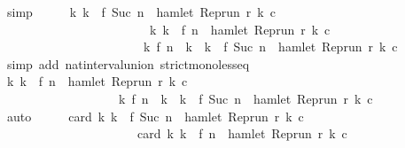 \begin{isabellebody}
\ simp\isanewline
\ \ \isamarkupfalse%
\ \isamarkupfalse%
\ {\isacartoucheopen}{\isacharbraceleft}k{\isachardot}\ k\ {\isasymle}\ f\ {\isacharparenleft}Suc\ n{\isacharparenright}\ {\isasymand}\ hamlet\ {\isacharparenleft}{\isacharparenleft}Rep{\isacharunderscore}run\ r{\isacharparenright}\ k\ c{\isacharparenright}{\isacharbraceright}\ {\isacharequal}\isanewline
\ \ \ \ \ \ \ \ \ \ \ \ \ \ \ \ \ \ \ \ \ \ \ \ {\isacharbraceleft}k{\isachardot}\ k\ {\isasymle}\ f\ n\ {\isasymand}\ hamlet\ {\isacharparenleft}{\isacharparenleft}Rep{\isacharunderscore}run\ r{\isacharparenright}\ k\ c{\isacharparenright}{\isacharbraceright}\isanewline
\ \ \ \ \ \ \ \ \ \ \ \ \ \ \ \ \ \ \ \ \ \ {\isasymunion}\ {\isacharbraceleft}k{\isachardot}\ f\ n\ {\isacharless}\ k\ {\isasymand}\ k\ {\isasymle}\ f\ {\isacharparenleft}Suc\ n{\isacharparenright}\ {\isasymand}\ hamlet\ {\isacharparenleft}{\isacharparenleft}Rep{\isacharunderscore}run\ r{\isacharparenright}\ k\ c{\isacharparenright}{\isacharbraceright}{\isacartoucheclose}\isanewline
\ \ \ \ \isamarkupfalse%
\ {\isacharparenleft}simp\ add{\isacharcolon}\ nat{\isacharunderscore}interval{\isacharunderscore}union\ strict{\isacharunderscore}mono{\isacharunderscore}less{\isacharunderscore}eq{\isacharparenright}\isanewline
\ \ \isamarkupfalse%
\ \isamarkupfalse%
\ {\isacartoucheopen}{\isacharbraceleft}k{\isachardot}\ k\ {\isasymle}\ f\ n\ {\isasymand}\ hamlet\ {\isacharparenleft}{\isacharparenleft}Rep{\isacharunderscore}run\ r{\isacharparenright}\ k\ c{\isacharparenright}{\isacharbraceright}\isanewline
\ \ \ \ \ \ \ \ \ \ \ \ \ \ \ \ \ \ {\isasyminter}\ {\isacharbraceleft}k{\isachardot}\ f\ n\ {\isacharless}\ k\ {\isasymand}\ k\ {\isasymle}\ f\ {\isacharparenleft}Suc\ n{\isacharparenright}\ {\isasymand}\ hamlet\ {\isacharparenleft}{\isacharparenleft}Rep{\isacharunderscore}run\ r{\isacharparenright}\ k\ c{\isacharparenright}{\isacharbraceright}\ {\isacharequal}\ {\isacharbraceleft}{\isacharbraceright}{\isacartoucheclose}\isanewline
\ \ \ \ \ \isamarkupfalse%
\ auto\isanewline
\ \ \isamarkupfalse%
\ \isamarkupfalse%
\ {\isacartoucheopen}card\ {\isacharbraceleft}k{\isachardot}\ k\ {\isasymle}\ f\ {\isacharparenleft}Suc\ n{\isacharparenright}\ {\isasymand}\ hamlet\ {\isacharparenleft}Rep{\isacharunderscore}run\ r\ k\ c{\isacharparenright}{\isacharbraceright}\ {\isacharequal}\isanewline
\ \ \ \ \ \ \ \ \ \ \ \ \ \ \ \ \ \ \ \ \ \ card\ {\isacharbraceleft}k{\isachardot}\ k\ {\isasymle}\ f\ n\ {\isasymand}\ hamlet\ {\isacharparenleft}Rep{\isacharunderscore}run\ r\ k\ c{\isacharparenright}{\isacharbraceright}\isanewline

\end{isabellebody}
